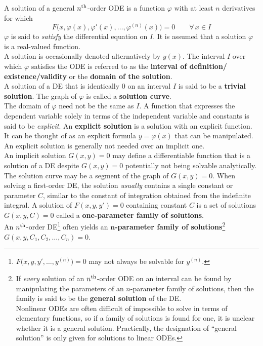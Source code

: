 \documentclass[../Differential Equations.tex]{subfiles}
\begin{document}
			A solution of a general \(n^{\text{th}}\)-order ODE is a function \(\varphi\) with at least \(n\) derivatives for which
				\[F\bigl(x, \varphi(x), \varphi'(x), \ldots, \varphi^{(n)}(x)\bigr) = 0 \qquad \forall\,x \in I\]
			\(\varphi\) is said to \textit{satisfy} the differential equation on \(I\). It is assumed that a solution \(\varphi\) is a real-valued function. \\
			A solution is occasionally denoted alternatively by \(y(x)\).
			The interval \(I\) over which \(\varphi\) satisfies the ODE is referred to as the \textbf{interval of definition/}\hspace{-5pt} \textbf{existence/validity}  or the \textbf{domain of the solution}. \\
			A solution of a DE that is identically 0 on an interval \(I\) is said to be a \textbf{trivial solution}.
			The graph of \(\varphi\) is called a \textbf{solution curve}. \\
			The domain of \(\varphi\) need not be the same as \(I\).
			A function that expresses the dependent variable solely in terms of the independent variable and constants is said to be \textit{explicit}. An \textbf{explicit solution} is a solution with an explicit function. It can be thought of as an explicit formula \(y = \varphi(x)\) that can be manipulated. \\
			An explicit solution is generally not needed over an implicit one. \\
			An implicit solution \(G(x, y) = 0\) may define a differentiable function that is a solution of a DE despite \(G(x, y) = 0\) potentially not being solvable analytically. The solution curve may be a segment of the graph of \(G(x, y) = 0\).
			When solving a first-order DE, the solution \textit{usually} contains a single constant or parameter \(C\), similar to the constant of integration obtained from the indefinite integral. A solution of \(F(x, y, y') = 0\) containing constant \(C\) is a set of solutions \(G(x, y, C) = 0\) called a \textbf{one-parameter family of solutions}. \\
			An \(n^{\text{th}}\)-order DE\footnote{
					\(F\bigl(x, y, y', \ldots, y^{(n)}\bigr) = 0\) may not always be solvable for \(y^{(n)}\).
				} often yields an \textbf{\(\bm{n}\)-parameter family of solutions}\footnote{
					If \textit{every} solution of an \(n^{\text{th}}\)-order ODE on an interval can be found by manipulating the parameters of an \(n\)-parameter family of solutions, then the family is said to be the \textbf{general solution} of the DE. \\
					Nonlinear ODEs are often difficult of impossible to solve in terms of elementary functions, so if a family of solutions is found for one, it is unclear whether it is a general solution. Practically, the designation of \enquote{general solution} is only given for solutions to linear ODEs.
				} \(G(x, y, C_1, C_2, \ldots, C_n) = 0\). \\
\end{document}
